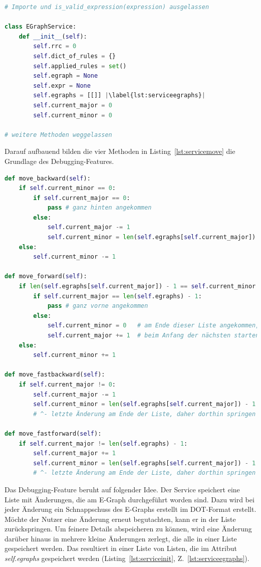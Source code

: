 \begin{lstlisting}[language=Python, escapechar=|, caption=Auszug aus der Datei \textit{EGraphService.py}, label={lst:serviceinit}]
# Importe und is_valid_expression(expression) ausgelassen 

class EGraphService:
    def __init__(self):
        self.rrc = 0
        self.dict_of_rules = {}
        self.applied_rules = set()
        self.egraph = None
        self.expr = None
        self.egraphs = [[]] |\label{lst:serviceegraphs}|
        self.current_major = 0
        self.current_minor = 0

# weitere Methoden weggelassen
\end{lstlisting} 

Darauf aufbauend bilden die vier Methoden in Listing~\ref{lst:servicemove} die Grundlage des Debugging-Features.

\begin{lstlisting}[language=Python, escapechar=|, caption=Methoden für das Debugging aus der Datei \textit{EGraphService.py}, label={lst:servicemove}]
def move_backward(self):
    if self.current_minor == 0:
        if self.current_major == 0:
            pass # ganz hinten angekommen
        else:
            self.current_major -= 1
            self.current_minor = len(self.egraphs[self.current_major]) - 1
    else:
        self.current_minor -= 1

def move_forward(self):
    if len(self.egraphs[self.current_major]) - 1 == self.current_minor:
        if self.current_major == len(self.egraphs) - 1:
            pass # ganz vorne angekommen
        else:
            self.current_minor = 0   # am Ende dieser Liste angekommen,
            self.current_major += 1  # beim Anfang der nächsten starten
    else:
        self.current_minor += 1

def move_fastbackward(self):
    if self.current_major != 0:
        self.current_major -= 1
        self.current_minor = len(self.egraphs[self.current_major]) - 1
        # ^- letzte Änderung am Ende der Liste, daher dorthin springen

def move_fastforward(self):
    if self.current_major != len(self.egraphs) - 1:
        self.current_major += 1
        self.current_minor = len(self.egraphs[self.current_major]) - 1
        # ^- letzte Änderung am Ende der Liste, daher dorthin springen
\end{lstlisting} 

Das Debugging-Feature beruht auf folgender Idee. Der Service speichert eine Liste mit Änderungen, die am E-Graph durchgeführt worden sind.
Dazu wird bei jeder Änderung ein Schnappschuss des E-Graphs erstellt im DOT-Format erstellt.
Möchte der Nutzer eine Änderung erneut begutachten, kann er in der Liste zurückspringen. Um feinere Details abspeicheren zu können, wird 
eine Änderung darüber hinaus in mehrere kleine Änderungen zerlegt, die alle in einer Liste gespeichert werden. Das resultiert in einer Liste von Listen,
die im Attribut \textit{self.egraphs} gespeichert werden (Listing~\ref{lst:serviceinit}, Z.~\ref{lst:serviceegraphs}).

